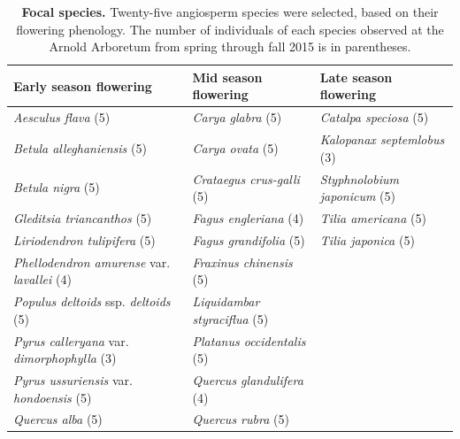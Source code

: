 \documentclass{article}
\begin{document}
\begin{table}[p]
  \caption{\textbf{Focal species.} Twenty-five angiosperm species were selected, based on their flowering phenology. The number of individuals of each species observed at the Arnold Arboretum from spring through fall 2015 is in parentheses.}
\begin{footnotesize} 
   \begin{tabular}{| p{5.5cm} | p{5.5cm} | p{5.5cm} |}
    \hline
  \bf{Early season flowering} & \bf{Mid season flowering} & \bf{Late season flowering} \\ \hline
    \textit{Aesculus flava} (5) & \textit{Carya glabra} (5) & \textit{Catalpa speciosa} (5) \\ 
    \textit{Betula alleghaniensis} (5) & \textit{Carya ovata} (5) & \textit{Kalopanax septemlobus} (3) \\ 
    \textit{Betula nigra} (5) & \textit{Crataegus crus-galli} (5) & \textit{Styphnolobium japonicum} (5) \\ 
\textit{Gleditsia triancanthos} (5) & \textit{Fagus engleriana} (4) & \textit{Tilia americana} (5) \\ 
\textit{Liriodendron tulipifera} (5) & \textit{Fagus grandifolia} (5) & \textit{Tilia japonica} (5) \\ 
\textit{Phellodendron amurense} var. \textit{lavallei} (4) & \textit{Fraxinus chinensis} (5) &\\ \textit{Populus deltoids} ssp. \textit{deltoids} (5) & \textit{Liquidambar styraciflua} (5) & \\ 
\textit{Pyrus calleryana} var. \textit{dimorphophylla} (3) & \textit{Platanus occidentalis} (5) & \\ 
\textit{Pyrus ussuriensis} var. \textit{hondoensis} (5) & \textit{Quercus glandulifera} (4) & \\ \textit{Quercus alba} (5) & \textit{Quercus rubra} (5) &  \\ \hline
     \end{tabular}    
\end{footnotesize} 
    \end{table}
\clearpage
\end{document}
